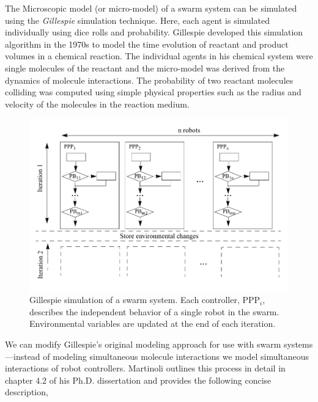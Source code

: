 \documentclass[Main.tex]{subfiles}
\begin{document}
The Microscopic model (or micro-model) of a swarm system can be simulated using the \emph{Gillespie} simulation technique\cite{Gillespie1976,Gillespie1977}. Here, each agent is simulated individually using dice rolls and probability. Gillespie developed this simulation algorithm in the 1970s to model the time evolution of reactant and product volumes in a chemical reaction. The individual agents in his chemical system were single molecules of the reactant and the micro-model was derived from the dynamics of molecule interactions. The probability of two reactant molecules colliding was computed using simple physical properties such as the radius and velocity of the molecules in the reaction medium\cite{Gillespie1976}. 
\begin{figure}[!t]
\centering\includegraphics[width=15cm]{assets/martinoliModelMethod.png}
\centering\caption{Gillespie simulation of a swarm system. Each controller, PPP$_i$, describes the independent behavior of a single robot in the swarm. Environmental variables are updated at the end of each iteration.}\label{fig:micromodel}
\end{figure}

We can modify Gillespie's original modeling approach for use with swarm systems---instead of modeling simultaneous molecule interactions we model simultaneous interactions of robot controllers. Martinoli outlines this process in detail in chapter 4.2 of his Ph.D. dissertation\cite{Martinoli1999b} and provides the following concise description,
\end{document}
